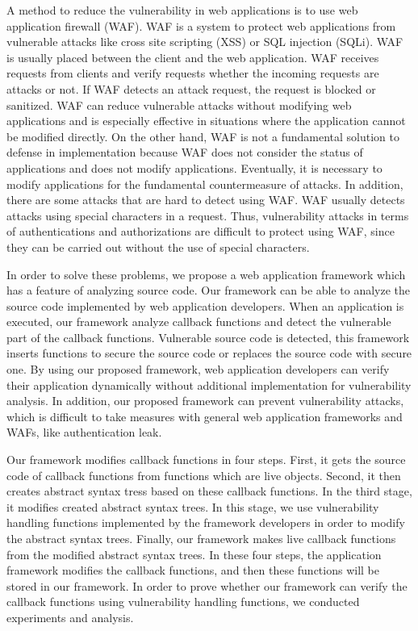 \documentclass[conference]{IEEEtran}
\begin{document}
A method to reduce the vulnerability in web applications is to use web application firewall (WAF)\cite{kruegel2003anomaly, epp2017anomaly, makiou2014improving, krueger2010tokdoc, ito2018web}.
WAF is a system to protect web applications from vulnerable attacks like cross site scripting (XSS)\cite{subramaniyaswamy2018securing} or SQL injection (SQLi)\cite{halfond2005amnesia}.
WAF is usually placed between the client and the web application.
WAF receives requests from clients and verify requests whether the incoming requests are attacks or not.
If WAF detects an attack request, the request is blocked or sanitized.
WAF can reduce vulnerable attacks without modifying web applications and is especially effective in situations where the application cannot be modified directly.
On the other hand, WAF is not a fundamental solution to defense in implementation because WAF does not consider the status of applications and does not modify applications.
Eventually, it is necessary to modify applications for the fundamental countermeasure of attacks.
In addition, there are some attacks that are hard to detect using WAF.
WAF usually detects attacks using special characters in a request.
Thus, vulnerability attacks in terms of authentications and authorizations are difficult to protect using WAF,  since they can be carried out without the use of special characters.

In order to solve these problems, we propose a web application framework which has a feature of analyzing source code.
Our framework can be able to analyze the source code implemented by web application developers.
When an application is executed, our framework analyze callback functions and detect the vulnerable part of the callback functions.
Vulnerable source code is detected, this framework inserts functions to secure the source code or replaces the source code with secure one.
By using our proposed framework, web application developers can verify their application dynamically without additional implementation for vulnerability analysis.
In addition, our proposed framework can prevent vulnerability attacks, which is difficult to take measures with general web application frameworks and WAFs,  like authentication leak.

Our framework modifies callback functions in four steps.
First, it gets the source code of callback functions from functions which are live objects.
Second, it then creates abstract syntax tress based on these callback functions.
In the third stage, it modifies created abstract syntax trees. In this stage, we use vulnerability handling functions implemented by the framework developers in order to modify the abstract syntax trees.
Finally, our framework makes live callback functions from the modified abstract syntax trees.
In these four steps, the application framework modifies the callback functions, and then these functions will be stored in our framework.
In order to prove whether our framework can verify the callback functions using vulnerability handling functions, we conducted experiments and analysis.
\end{document}
